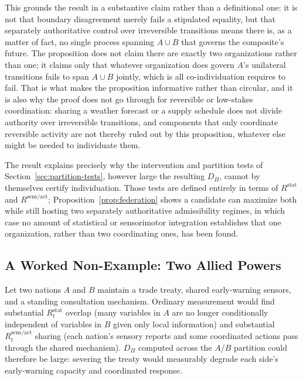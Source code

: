 \documentclass[11pt]{article}
\begin{document}
This grounds the result in a substantive claim rather than a definitional one: it is not that boundary disagreement merely fails a stipulated equality, but that separately authoritative control over irreversible transitions means there is, as a matter of fact, no single process spanning $A\cup B$ that governs the composite's future. The proposition does not claim there are exactly two organizations rather than one; it claims only that whatever organization does govern $A$'s unilateral transitions fails to span $A\cup B$ jointly, which is all co-individuation requires to fail. That is what makes the proposition informative rather than circular, and it is also why the proof does not go through for reversible or low-stakes coordination: sharing a weather forecast or a supply schedule does not divide authority over irreversible transitions, and components that only coordinate reversible activity are not thereby ruled out by this proposition, whatever else might be needed to individuate them.

The result explains precisely why the intervention and partition tests of Section~\ref{sec:partition-tests}, however large the resulting $D_\Pi$, cannot by themselves certify individuation. Those tests are defined entirely in terms of $R^{\mathrm{stat}}$ and $R^{\mathrm{sens/act}}$; Proposition~\ref{prop:federation} shows a candidate can maximize both while still hosting two separately authoritative admissibility regimes, in which case no amount of statistical or sensorimotor integration establishes that one organization, rather than two coordinating ones, has been found.

\subsection{A Worked Non-Example: Two Allied Powers}

Let two nations $A$ and $B$ maintain a trade treaty, shared early-warning sensors, and a standing consultation mechanism. Ordinary measurement would find substantial $R^{\mathrm{stat}}_t$ overlap (many variables in $A$ are no longer conditionally independent of variables in $B$ given only local information) and substantial $R^{\mathrm{sens/act}}_t$ sharing (each nation's sensory reports and some coordinated actions pass through the shared mechanism). $D_\Pi$ computed across the $A$/$B$ partition could therefore be large: severing the treaty would measurably degrade each side's early-warning capacity and coordinated response.
\end{document}
